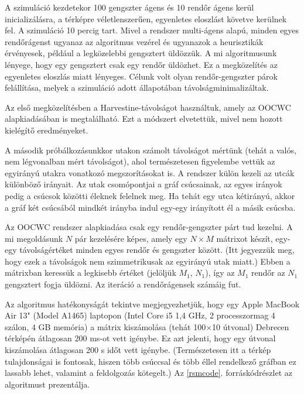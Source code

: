 \documentclass[a4paper,12pt]{report}
\begin{document}
A szimuláció kezdetekor 100 gengszter ágens és 10 rendőr ágens kerül inicializálásra, a térképre véletlenszerűen, egyenletes eloszlást követve kerülnek fel. A szimuláció 10 percig tart. Mivel a rendszer multi-ágens alapú, minden egyes rendőrágenst ugyanaz az algoritmus vezérel és ugyanazok a heurisztikák érvényesek, például a legközelebbi gengsztert üldözzük. A mi algoritmusunk lényege, hogy egy gengsztert csak egy rendőr üldözhet. Ez a megközelítés az egyenletes eloszlás miatt lényeges. Célunk volt olyan rendőr-gengszter párok felállítása, melyek a szimuláció adott állapotában távolságminimalizáltak.

Az első megközelítésben a Harvestine-távolságot használtuk, amely az OOCWC alapkiadásában is megtalálható. Ezt a módszert elvetettük, mivel nem hozott kielégítő eredményeket.

A második próbálkozásunkkor utakon számolt távolságot mértünk (tehát a valós, nem légvonalban mért távolságot), ahol természetesen figyelembe vettük az egyirányú utakra vonatkozó megszorításokat is. A rendszer külön kezeli az utcák különböző irányait. Az utak csomópontjai a gráf csúcsainak, az egyes irányok pedig a csúcsok közötti éleknek felelnek meg. Ha tehát egy utca kétirányú, akkor a gráf két csúcsából mindkét irányba indul egy-egy irányított él a másik csúcsba. 

Az OOCWC rendszer alapkiadása csak egy rendőr-gengszter párt tud kezelni. A mi megoldásunk $N$ pár kezelésére képes, amely egy $N{\times}M$ mátrixot készít, egy-egy távolságértéket minden egyes rendőr és gengszter között. (Itt jegyezzük meg, hogy ezek a távolságok nem szimmetrikusak az egyirányú utak miatt.) Ebben a mátrixban keressük a legkisebb értéket (jelöljük $M_1$, $N_1$), így az $M_1$ rendőr az $N_1$ gengsztert fogja üldözni. Az iteráció a rendőrágensek számáig fut.

Az algoritmus hatékonyságát tekintve megjegyezhetjük, hogy egy Apple MacBook Air 13" (Model A1465) laptopon (Intel Core i5 1,4 GHz, 2 processzormag 4 szálon, 4 GB memória) a mátrix kiszámolása (tehát 100$\times$10 útvonal) Debrecen térképén átlagosan 200 ms-ot vett igénybe. Ez azt jelenti, hogy egy útvonal kiszámolása átlagosan 200 \si{\micro}s időt vett igénybe. (Természetesen itt a térkép tulajdonságai is fontosak, hiszen több csúccsal és több éllel rendelkező gráfban ez lassabb lehet, valamint a feldolgozás kötegelt.) Az \ref{rsmcode}. forráskódrészlet az algoritmust prezentálja.

\newpage

\end{document}
